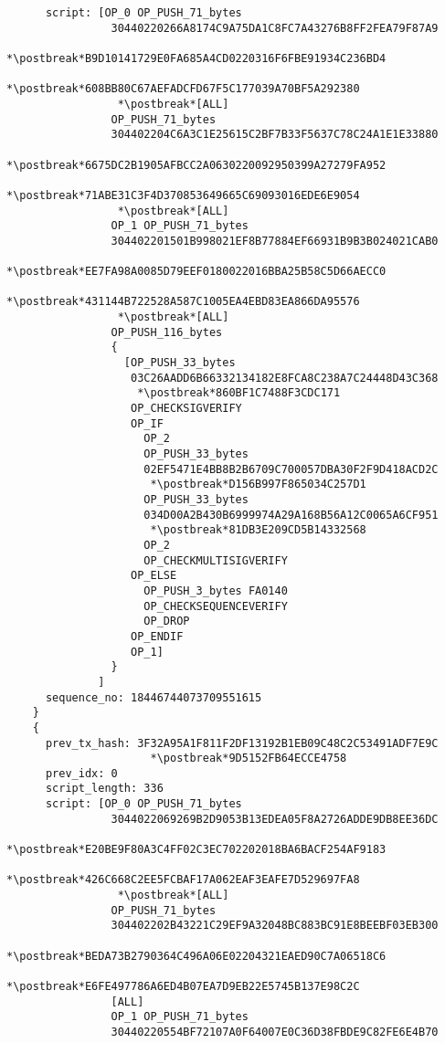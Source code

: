 \begin{lstlisting}
      script: [OP_0 OP_PUSH_71_bytes
                30440220266A8174C9A75DA1C8FC7A43276B8FF2FEA79F87A9
                 *\postbreak*B9D10141729E0FA685A4CD0220316F6FBE91934C236BD4
                 *\postbreak*608BB80C67AEFADCFD67F5C177039A70BF5A292380
                 *\postbreak*[ALL]
                OP_PUSH_71_bytes
                304402204C6A3C1E25615C2BF7B33F5637C78C24A1E1E33880
                 *\postbreak*6675DC2B1905AFBCC2A0630220092950399A27279FA952
                 *\postbreak*71ABE31C3F4D370853649665C69093016EDE6E9054
                 *\postbreak*[ALL]
                OP_1 OP_PUSH_71_bytes
                304402201501B998021EF8B77884EF66931B9B3B024021CAB0
                 *\postbreak*EE7FA98A0085D79EEF0180022016BBA25B58C5D66AECC0
                 *\postbreak*431144B722528A587C1005EA4EBD83EA866DA95576
                 *\postbreak*[ALL]
                OP_PUSH_116_bytes
                {
                  [OP_PUSH_33_bytes
                   03C26AADD6B66332134182E8FCA8C238A7C24448D43C368
                    *\postbreak*860BF1C7488F3CDC171
                   OP_CHECKSIGVERIFY
                   OP_IF
                     OP_2
                     OP_PUSH_33_bytes
                     02EF5471E4BB8B2B6709C700057DBA30F2F9D418ACD2C
                      *\postbreak*D156B997F865034C257D1
                     OP_PUSH_33_bytes
                     034D00A2B430B6999974A29A168B56A12C0065A6CF951
                      *\postbreak*81DB3E209CD5B14332568
                     OP_2
                     OP_CHECKMULTISIGVERIFY
                   OP_ELSE
                     OP_PUSH_3_bytes FA0140
                     OP_CHECKSEQUENCEVERIFY
                     OP_DROP
                   OP_ENDIF
                   OP_1]
                }
              ]
      sequence_no: 18446744073709551615
    }
    {
      prev_tx_hash: 3F32A95A1F811F2DF13192B1EB09C48C2C53491ADF7E9C
                      *\postbreak*9D5152FB64ECCE4758
      prev_idx: 0
      script_length: 336
      script: [OP_0 OP_PUSH_71_bytes
                3044022069269B2D9053B13EDEA05F8A2726ADDE9DB8EE36DC
                 *\postbreak*E20BE9F80A3C4FF02C3EC702202018BA6BACF254AF9183
                 *\postbreak*426C668C2EE5FCBAF17A062EAF3EAFE7D529697FA8
                 *\postbreak*[ALL]
                OP_PUSH_71_bytes
                304402202B43221C29EF9A32048BC883BC91E8BEEBF03EB300
                 *\postbreak*BEDA73B2790364C496A06E02204321EAED90C7A06518C6
                 *\postbreak*E6FE497786A6ED4B07EA7D9EB22E5745B137E98C2C
                [ALL]
                OP_1 OP_PUSH_71_bytes
                30440220554BF72107A0F64007E0C36D38FBDE9C82FE6E4B70

\end{lstlisting}
